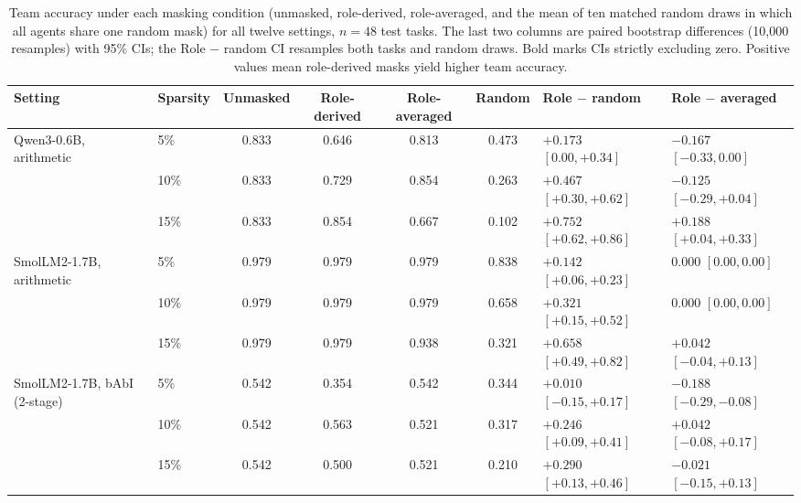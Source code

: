 \begin{table}[t]
\centering
\caption{Team accuracy under each masking condition (unmasked, role-derived, role-averaged, and
the mean of ten matched random draws in which all agents share one random mask) for all twelve
settings, $n=48$ test tasks. The last two columns are paired bootstrap differences (10{,}000
resamples) with 95\% CIs; the Role $-$ random CI resamples both tasks and random draws. Bold marks
CIs strictly excluding zero. Positive values mean role-derived masks yield higher team accuracy.}
\label{tab:absolute}
\small
\begin{tabular}{llccccll}
\toprule
Setting & Sparsity & Unmasked & Role-derived & Role-averaged & Random & Role $-$ random & Role $-$ averaged \\
\midrule
Qwen3-0.6B, arithmetic & 5\% & 0.833 & 0.646 & 0.813 & 0.473 & $+0.173$ {\scriptsize $[0.00, +0.34]$} & $-0.167$ {\scriptsize $[-0.33, 0.00]$} \\
 & 10\% & 0.833 & 0.729 & 0.854 & 0.263 & $\mathbf{+0.467}$ {\scriptsize $[+0.30, +0.62]$} & $-0.125$ {\scriptsize $[-0.29, +0.04]$} \\
 & 15\% & 0.833 & 0.854 & 0.667 & 0.102 & $\mathbf{+0.752}$ {\scriptsize $[+0.62, +0.86]$} & $\mathbf{+0.188}$ {\scriptsize $[+0.04, +0.33]$} \\
\addlinespace
SmolLM2-1.7B, arithmetic & 5\% & 0.979 & 0.979 & 0.979 & 0.838 & $\mathbf{+0.142}$ {\scriptsize $[+0.06, +0.23]$} & $0.000$ {\scriptsize $[0.00, 0.00]$} \\
 & 10\% & 0.979 & 0.979 & 0.979 & 0.658 & $\mathbf{+0.321}$ {\scriptsize $[+0.15, +0.52]$} & $0.000$ {\scriptsize $[0.00, 0.00]$} \\
 & 15\% & 0.979 & 0.979 & 0.938 & 0.321 & $\mathbf{+0.658}$ {\scriptsize $[+0.49, +0.82]$} & $+0.042$ {\scriptsize $[-0.04, +0.13]$} \\
\addlinespace
SmolLM2-1.7B, bAbI (2-stage) & 5\% & 0.542 & 0.354 & 0.542 & 0.344 & $+0.010$ {\scriptsize $[-0.15, +0.17]$} & $\mathbf{-0.188}$ {\scriptsize $[-0.29, -0.08]$} \\
 & 10\% & 0.542 & 0.563 & 0.521 & 0.317 & $\mathbf{+0.246}$ {\scriptsize $[+0.09, +0.41]$} & $+0.042$ {\scriptsize $[-0.08, +0.17]$} \\
 & 15\% & 0.542 & 0.500 & 0.521 & 0.210 & $\mathbf{+0.290}$ {\scriptsize $[+0.13, +0.46]$} & $-0.021$ {\scriptsize $[-0.15, +0.13]$} \\

\end{tabular}
\end{table}

